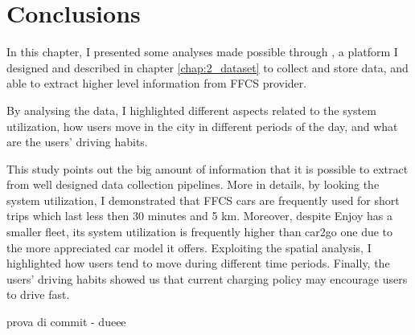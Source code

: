 \section{Conclusions}
\label{sec:3_6_conclusion}

In this chapter, I presented some analyses made possible through \tool, a platform I designed and described in chapter \ref{chap:2_dataset} to collect and store data, and able to extract higher level information from FFCS provider.

By analysing the data, I highlighted different aspects related to the system utilization, how users move in the city in different periods of the day, and what are the users' driving habits.

This study points out the big amount of information that it is possible to extract from well designed data collection pipelines. More in details, by looking the system utilization, I demonstrated that FFCS cars are frequently used for short trips which last less then 30 minutes and 5 km. Moreover, despite Enjoy has a smaller fleet, its system utilization is frequently higher than car2go one due to the more appreciated car model it offers. Exploiting the spatial analysis, I highlighted how users tend to move during different time periods. Finally, the users' driving habits showed us that current charging policy may encourage users to drive fast. 

prova di commit - dueee